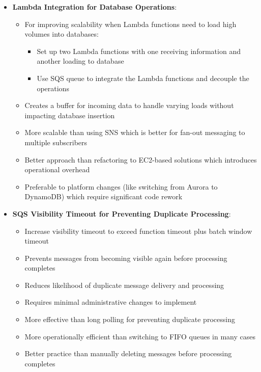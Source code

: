 \documentclass[11pt,a4paper]{report}
\begin{document}
\begin{itemize}
\begin{itemize}
  \item This approach addresses delayed message processing by dynamically scaling based on workload
  \item More effective than solutions focusing on database performance (like DAX) when the bottleneck is message processing
  \item More targeted than adding API Gateway or CloudFront when the issue is backend processing capacity
  \item Perfect for finance applications where timely processing of customer requests is critical
\end{itemize}
  \item \textbf{Lambda Integration for Database Operations}:
\begin{itemize}
  \item For improving scalability when Lambda functions need to load high volumes into databases:
\begin{itemize}
  \item Set up two Lambda functions with one receiving information and another loading to database
  \item Use SQS queue to integrate the Lambda functions and decouple the operations
\end{itemize}
  \item Creates a buffer for incoming data to handle varying loads without impacting database insertion
  \item More scalable than using SNS which is better for fan-out messaging to multiple subscribers
  \item Better approach than refactoring to EC2-based solutions which introduces operational overhead
  \item Preferable to platform changes (like switching from Aurora to DynamoDB) which require significant code rework
\end{itemize}
  \item \textbf{SQS Visibility Timeout for Preventing Duplicate Processing}:
\begin{itemize}
  \item Increase visibility timeout to exceed function timeout plus batch window timeout
  \item Prevents messages from becoming visible again before processing completes
  \item Reduces likelihood of duplicate message delivery and processing
  \item Requires minimal administrative changes to implement
  \item More effective than long polling for preventing duplicate processing
  \item More operationally efficient than switching to FIFO queues in many cases
  \item Better practice than manually deleting messages before processing completes
\end{itemize}
\end{itemize}
\end{document}
